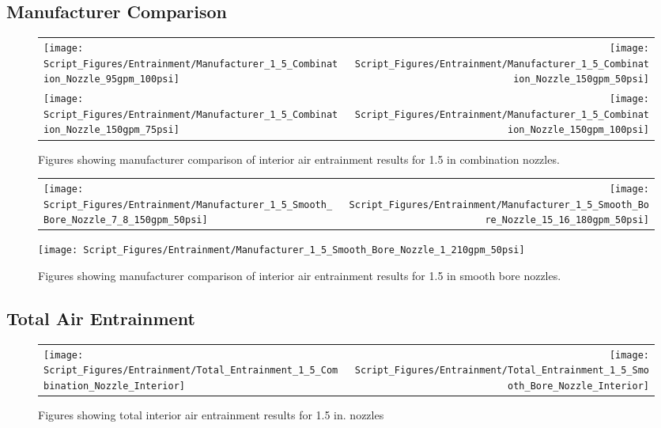 \documentclass{article}
\begin{document}
\subsection{Manufacturer Comparison}

\begin{figure}[!ht]
\begin{tabular*}{\textwidth}{lr}
\texttt{[image: Script\_Figures/Entrainment/Manufacturer\_1\_5\_Combination\_Nozzle\_95gpm\_100psi]} &
\texttt{[image: Script\_Figures/Entrainment/Manufacturer\_1\_5\_Combination\_Nozzle\_150gpm\_50psi]} \\
\texttt{[image: Script\_Figures/Entrainment/Manufacturer\_1\_5\_Combination\_Nozzle\_150gpm\_75psi]} &
\texttt{[image: Script\_Figures/Entrainment/Manufacturer\_1\_5\_Combination\_Nozzle\_150gpm\_100psi]} \\
\end{tabular*}
\caption{Figures showing manufacturer comparison of interior air entrainment results for 1.5 in combination nozzles.}
\label{fig:1_5_Interior_Combination_Manufacturer}
\end{figure}

\clearpage

\begin{figure}[!ht]
\begin{tabular*}{\textwidth}{lr}
\texttt{[image: Script\_Figures/Entrainment/Manufacturer\_1\_5\_Smooth\_Bore\_Nozzle\_7\_8\_150gpm\_50psi]} &
\texttt{[image: Script\_Figures/Entrainment/Manufacturer\_1\_5\_Smooth\_Bore\_Nozzle\_15\_16\_180gpm\_50psi]} \\
\end{tabular*}
\centering
\texttt{[image: Script\_Figures/Entrainment/Manufacturer\_1\_5\_Smooth\_Bore\_Nozzle\_1\_210gpm\_50psi]} 
\caption{Figures showing manufacturer comparison of interior air entrainment results for 1.5 in smooth bore nozzles.}
\label{fig:1_5_Interior_Smooth_Bore_Manufacturer}
\end{figure}

\clearpage

\subsection{Total Air Entrainment}

\begin{figure}[!ht]
\begin{tabular*}{\textwidth}{lr}
\texttt{[image: Script\_Figures/Entrainment/Total\_Entrainment\_1\_5\_Combination\_Nozzle\_Interior]} &
\texttt{[image: Script\_Figures/Entrainment/Total\_Entrainment\_1\_5\_Smooth\_Bore\_Nozzle\_Interior]} \\
\end{tabular*}
\caption{Figures showing total interior air entrainment results for 1.5 in. nozzles}
\label{fig:1_5_Interior_Total_Entrainment}
\end{figure}
\end{document}
